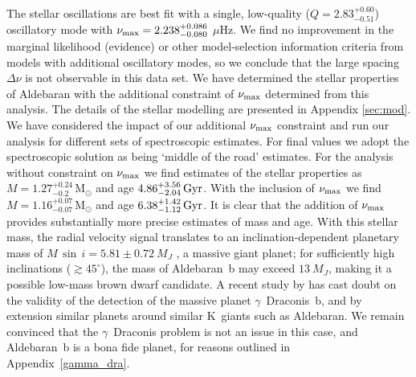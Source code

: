\documentclass[modern]{aastex61}
\newcommand{\numax}{\mbox{$\nu_{\rm max}$}\xspace}
\newcommand{\muHz}{\mbox{$\mu$Hz}\xspace}
\newcommand{\twosidedrange}[3]{\ensuremath{#1^{+#2}_{-#3}}}
\newcommand{\CombinedQRange}{\twosidedrange{2.83}{0.60}{0.51}}
\begin{document}
The stellar oscillations are best fit with a single, low-quality ($Q =
\CombinedQRange{}$) oscillatory mode with $\numax = 2.238^{+ 0.086}_{- 0.080}$
\muHz.  We find no improvement in the marginal likelihood (evidence) or other
model-selection information criteria \citep{Gelman2013} from models with
additional oscillatory modes, so we conclude that the large spacing $\Delta\nu$
is not observable in this data set.  We have determined the stellar properties
of Aldebaran with the additional constraint of \numax determined from this
analysis.  The details of the stellar modelling are presented in Appendix
\ref{sec:mod}.  We have considered the impact of our additional \numax
constraint and run our analysis for different sets of spectroscopic estimates.
For final values we adopt the \citet{2012Sheffield} spectroscopic solution as
being `middle of the road' estimates.  For the analysis without constraint on
\numax we find estimates of the stellar properties as $M = 1.27^{+0.24}_{-0.2}
\, \mathrm{M_{\odot}}$ and age $4.86^{+3.56}_{-2.04} \, \rm Gyr$.  With the
inclusion of \numax we find $M = 1.16^{+0.07}_{-0.07} \, \mathrm{M_{\odot}}$ and
age $6.38^{+1.42}_{-1.12} \, \rm Gyr$.  It is clear that the addition of \numax
provides substantially more precise estimates of mass and age. With this stellar
mass, the radial velocity signal translates to an inclination-dependent
planetary mass of $M\,\sin\,{i} = 5.81 \pm 0.72~M_J$
\citep[Equation~1]{Torres2008}, a massive giant planet; for sufficiently high
inclinations ($\gtrsim 45^\circ$), the mass of Aldebaran~b may exceed $13~M_J$,
making it a possible low-mass brown dwarf candidate. A recent study by \citet{2018arXiv180105239H} has cast doubt on the validity of the detection of the massive planet $\gamma$~Draconis~b, and by extension similar planets around similar K~giants such as Aldebaran. We remain convinced that the $\gamma$~Draconis problem is not an issue in this case, and Aldebaran~b is a bona fide planet, for reasons outlined in Appendix~\ref{gamma_dra}.
\end{document}
